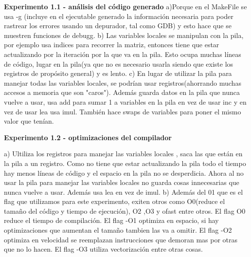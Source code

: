 \documentclass{article}
\begin{document}
\textbf{Experimento 1.1 - análisis del código generado}\newline
a)Porque en el MakeFile se usa -g (incluye en el ejecutable generado la información necesaria para poder rastrear los errores usando un depurador, tal como GDB) y esto hace que se muestren funciones de debugg.\newline
b) Las variables locales se manipulan con la pila, por ejemplo usa indices para recorrer la matriz, entonces tiene que estar actualizando por la iteración por la que va en la pila.\newline
Esto ocupa muchas líneas de código, lugar en la pila(ya que no es necesario usarla siendo que existe los registros de propósito general) y es lento. \newline
c) En lugar de utilizar la pila para manejar todas las variables locales, se podrían usar registros(ahorrando muchas accesos a memoria que son "caros").\newline
Además guarda datos en la pila que nunca vuelve a usar, usa add para sumar 1 a variables en la pila en vez de usar inc y en vez de usar lea usa imul.
También hace swaps de variables para poner el mismo valor que tenían.
\newline


\textbf{Experimento 1.2 - optimizaciones del compilador}\newline

a) Ultiliza los registros para manejar las variables locales , saca las que están en la pila a un registro. 
Como no tiene que estar actualizando la pila todo el tiempo hay menos líneas de código y el espacio en la pila no se desperdicia. 
Ahora al no usar la pila para manejar las variables locales no guarda cosas innecesarias que nunca vuelve a usar.\newline
Además usa lea en vez de imul.\newline
b) Además del 01 que es el flag que utilizamos para este experimento, exiten otros como O0(reduce el tamaño del código y tiempo de ejecución), O2 ,O3 y ofast entre otros.\newline
El flag O0 reduce el tiempo de compilación.
El flag -O1 optimiza en espacio, si hay optimizaciones que aumentan el tamaño tambien las va a omitir.\newline
El flag -O2 optimiza en velocidad se reemplazan instrucciones que demoran mas por otras que no lo hacen.\newline
El flag -O3 utiliza vectorización entre otras cosas. \newline
\end{document}
